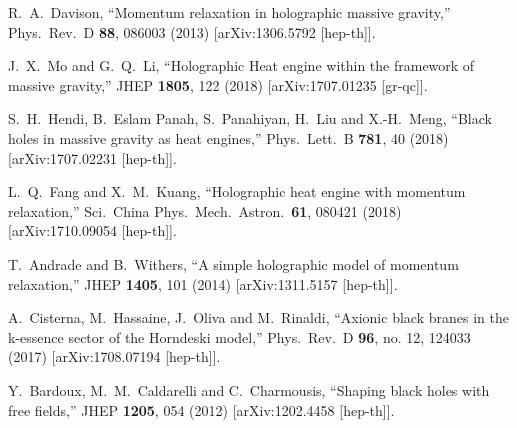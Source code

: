 \documentclass[preprint,showpacs,showkeys,onecolumn,nofootinbib]{revtex4}
\begin{document}
\begin{thebibliography}{99}
  R.~A.~Davison,
  ``Momentum relaxation in holographic massive gravity,''
  Phys.\ Rev.\ D {\bf 88}, 086003 (2013)
  [arXiv:1306.5792 [hep-th]].


  J.~X.~Mo and G.~Q.~Li,
  ``Holographic Heat engine within the framework of massive gravity,''
  JHEP {\bf 1805}, 122 (2018)
  [arXiv:1707.01235 [gr-qc]].


  S.~H.~Hendi, B.~Eslam Panah, S.~Panahiyan, H.~Liu and X.-H.~Meng,
  ``Black holes in massive gravity as heat engines,''
  Phys.\ Lett.\ B {\bf 781}, 40 (2018)
  [arXiv:1707.02231 [hep-th]].


  L.~Q.~Fang and X.~M.~Kuang,
  ``Holographic heat engine with momentum relaxation,''
  Sci.\ China Phys.\ Mech.\ Astron.\  {\bf 61}, 080421 (2018)
  [arXiv:1710.09054 [hep-th]].


  T.~Andrade and B.~Withers,
  ``A simple holographic model of momentum relaxation,''
  JHEP {\bf 1405}, 101 (2014)
  [arXiv:1311.5157 [hep-th]].



  A.~Cisterna, M.~Hassaine, J.~Oliva and M.~Rinaldi,
  ``Axionic black branes in the k-essence sector of the Horndeski model,''
  Phys.\ Rev.\ D {\bf 96}, no. 12, 124033 (2017)
  [arXiv:1708.07194 [hep-th]].


  Y.~Bardoux, M.~M.~Caldarelli and C.~Charmousis,
  ``Shaping black holes with free fields,''
  JHEP {\bf 1205}, 054 (2012)
  [arXiv:1202.4458 [hep-th]].



\end{thebibliography}
\end{document}
